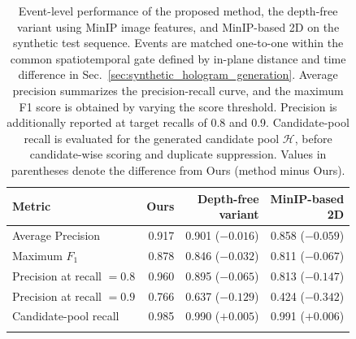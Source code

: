 \begin{table}[tbp]
  \centering
  \caption{Event-level performance of the proposed method, the depth-free variant using MinIP image features, and MinIP-based 2D on the synthetic test sequence. Events are matched one-to-one within the common spatiotemporal gate defined by in-plane distance and time difference in Sec.~\ref{sec:synthetic_hologram_generation}. Average precision summarizes the precision-recall curve, and the maximum F1 score is obtained by varying the score threshold. Precision is additionally reported at target recalls of 0.8 and 0.9. Candidate-pool recall is evaluated for the generated candidate pool $\mathcal{H}$, before candidate-wise scoring and duplicate suppression. Values in parentheses denote the difference from Ours (method minus Ours).}
  \label{tab:projected_xy_metric_summary}
  \begin{tabular}{lrrr}
    \hhline{====}
    Metric & Ours & \shortstack{Depth-free\\variant} & \shortstack{MinIP-based\\2D} \\
    \hline
    Average Precision & 0.917 & 0.901 ($-0.016$) & 0.858 ($-0.059$) \\
    Maximum $F_1$ & 0.878 & 0.846 ($-0.032$) & 0.811 ($-0.067$) \\
    Precision at recall $=0.8$ & 0.960 & 0.895 ($-0.065$) & 0.813 ($-0.147$) \\
    Precision at recall $=0.9$ & 0.766 & 0.637 ($-0.129$) & 0.424 ($-0.342$) \\
    Candidate-pool recall & 0.985 & 0.990 ($+0.005$) & 0.991 ($+0.006$) \\
    \hhline{====}
  \end{tabular}
\end{table}
